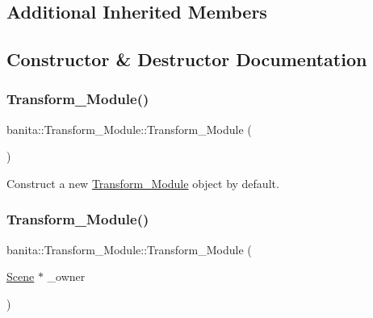 \subsection*{Additional Inherited Members}


\subsection{Constructor \& Destructor Documentation}
\mbox{\label{classbanita_1_1_transform___module_a881143ab58437a85c5d4c02dca1e4336}} 
\subsubsection{\texorpdfstring{Transform\_Module()}{Transform\_Module()}\hspace{0.1cm}{\footnotesize\ttfamily [1/2]}}
{\footnotesize\ttfamily banita\+::\+Transform\+\_\+\+Module\+::\+Transform\+\_\+\+Module (\begin{DoxyParamCaption}{ }\end{DoxyParamCaption})}



Construct a new \mbox{\hyperlink{classbanita_1_1_transform___module}{Transform\+\_\+\+Module}} object by default. 

\mbox{\label{classbanita_1_1_transform___module_aa698fc7ef98d9a075ef0a5dad9fa18ef}} 
\subsubsection{\texorpdfstring{Transform\_Module()}{Transform\_Module()}\hspace{0.1cm}{\footnotesize\ttfamily [2/2]}}
{\footnotesize\ttfamily banita\+::\+Transform\+\_\+\+Module\+::\+Transform\+\_\+\+Module (\begin{DoxyParamCaption}\item[{\mbox{\hyperlink{classbanita_1_1_scene}{Scene}} $\ast$}]{\+\_\+owner }\end{DoxyParamCaption})}




